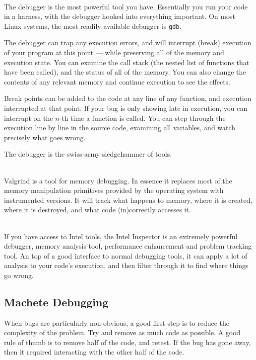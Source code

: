 \documentclass[a4paper,notitlepage]{scrreprt}
\newcommand\headitem[1]{\needspace{1.5\baselineskip}\item[{\boldmath #1 \nopagebreak}] \hfill \\ \nopagebreak}
\let\code\lstinline
\begin{document}
{{{	\begin{description}
		\headitem{Debuggers}
			The debugger is the most powerful tool you have. Essentially you
			run your code in a harness, with the debugger hooked into
			everything important. On most Linux systems, the most readily
			available debugger is \code{gdb}.

			The debugger can trap any execution errors, and will interrupt
			(break) execution of your program at this point --- while
			preserving all of the memory and execution state. You can examine
			the call stack (the nested list of functions that have been
			called), and the status of all of the memory. You can also change
			the contents of any relevant memory and continue execution to see
			the effects.

			Break points can be added to the code at any line of any function,
			and execution interrupted at that point. If your bug is only
			showing late in execution, you can interrupt on the $n$-th time
			a function is called. You can step through the execution line by
			line in the source code, examining all variables, and watch
			precisely what goes wrong.

			The debugger is the swiss-army sledgehammer of tools.

		\headitem{Valgrind}
			Valgrind is a tool for memory debugging. In essence it replaces
			most of the memory manipulation primitives provided by the
			operating system with instrumented versions. It will track what
			happens to memory, where it is created, where it is destroyed,
			and what code (in)correctly accesses it.

		\headitem{Intel Inspector XE}
			If you have access to Intel tools, the Intel Inspector is an
			extremely powerful debugger, memory analysis tool, performance
			enhancement and problem tracking tool. An top of a good interface
			to normal debugging tools, it can apply a lot of
			analysis to your code's execution, and then filter through it to
			find where things go wrong.
	\end{description}

\subsection{Machete Debugging}
	When bugs are particularly non-obvious, a good first step is to reduce the
	complexity of the problem. Try and remove as much code as possible. A good
	rule of thumb is to remove half of the code, and retest. If the bug has
	gone away, then it required interacting with the other half of the code.

}}}
\end{document}
